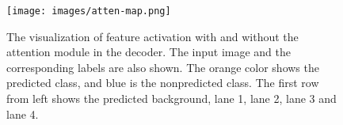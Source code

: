 \documentclass[journal]{IEEEtran}
\begin{document}
\begin{table}[h]
\centering
\caption{Comparison of the computational costs of the proposed LDNet and other state-of-the-art methods in terms of FLOPs and number of parameters.}
\label{FLOPS}
\end{table}
\begin{figure}[t]
      \centering
      \texttt{[image: images/atten-map.png]}
\caption{The visualization of feature activation with and without the attention module in the decoder. The input image and the corresponding labels are also shown. The orange color shows the predicted class, and blue is the nonpredicted class. The first row from left shows the predicted background, lane 1, lane 2, lane 3 and lane 4. }
      \label{atten-map}
\end{figure}
\end{document}
